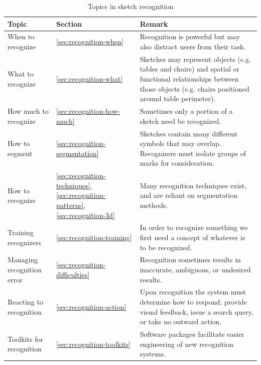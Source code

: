 \begin{landscape}
\begin{table}
\begin{tabular}{p{5cm}| p{2cm} | p{8.5cm}}
\textbf{Topic} & \textbf{Section} & \textbf{Remark} \\
\hline \hline
When to recognize & 
\ref{sec:recognition-when} &
Recognition is powerful but may also distract users from their
task. 
\\ \hline
What to recognize &
\ref{sec:recognition-what} & Sketches may represent objects
(e.g. tables and chairs) and spatial or functional relationships
between those objects (e.g. chairs positioned around table perimeter).
\\ \hline
How much to recognize &
\ref{sec:recognition-how-much} & 
Sometimes only a portion of a sketch need be recognized.
\\ \hline
How to segment &
\ref{sec:recognition-segmentation} &
Sketches contain many different symbols that may overlap. Recognizers
must isolate groups of marks for consideration.
\\ \hline
How to recognize &

\ref{sec:recognition-techniques}, \ref{sec:recognition-patterns}, 
\ref{sec:recognition-3d} &

Many recognition techniques exist, and are reliant on segmentation
methods. \\ \hline

Training recognizers &
\ref{sec:recognition-training} &
In order to recognize something we first need a concept of whatever is
to be recognized. \\ \hline

Managing recognition error &
\ref{sec:recognition-difficulties} &
Recognition sometimes results in inaccurate, ambiguous, or undesired
results.
\\ \hline
Reacting to recognition &
\ref{sec:recognition-action} &
Upon recognition the system must determine how to respond: provide
visual feedback, issue a search query, or take no outward action. \\ \hline

Toolkits for recognition &
\ref{sec:recognition-toolkits} &
Software packages facilitate easier engineering of new recognition
systems.\\ \hline

\end{tabular}
\caption{Topics in sketch recognition}
\label{tab:recognition-topics}
\end{table}
\end{landscape}

